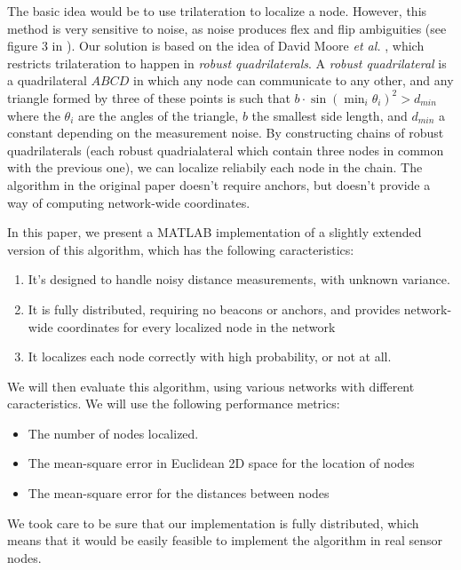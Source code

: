 \documentclass[letterpaper, 10 pt, conference]{ieeeconf}  %
\begin{document}
The basic idea would be to use trilateration to localize a node. However, this method is very sensitive to noise, as noise produces flex and flip ambiguities (see figure 3 in \cite{MooreTeller}). Our solution is based on the idea of David Moore \emph{et al.} \cite{MooreTeller}, which restricts trilateration to happen in \emph{robust quadrilaterals}. A \emph{robust quadrilateral} is a quadrilateral $ABCD$ in which any node can communicate to any other, and any triangle formed by three of these points is such that $b \cdot \sin(\min_i \theta_i)^2 > d_{min} $ where the $\theta_i$ are the angles of the triangle, $b$ the smallest side length, and $d_{min}$ a constant depending on the measurement noise. By constructing chains of robust quadrilaterals (each robust quadrialateral which contain three nodes in common with the previous one), we can localize reliabily each node in the chain. The algorithm in the original paper doesn't require anchors, but doesn't provide a way of computing network-wide coordinates.

In this paper, we present a MATLAB implementation of a slightly extended version of this algorithm, which has the following caracteristics:

\begin{enumerate}
    \item It's designed to handle noisy distance measurements, with unknown variance.
    \item It is fully distributed, requiring no beacons or anchors, and provides network-wide coordinates for every localized node in the network
    \item It localizes each node correctly with high probability, or not at all.
\end{enumerate}

We will then evaluate this algorithm, using various networks with different caracteristics. We will use the following performance metrics:

\begin{itemize}
    \item The number of nodes localized.
    \item The mean-square error in Euclidean 2D space for the location of nodes
    \item The mean-square error for the distances between nodes
\end{itemize}

We took care to be sure that our implementation is fully distributed, which means that it would be easily feasible to implement the algorithm in real sensor nodes.
\end{document}
